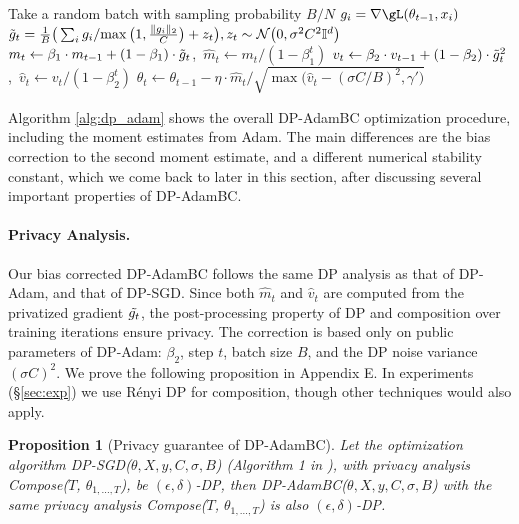 \documentclass[letterpaper]{article} %
\newtheorem{proposition}{Proposition}
\def\cN{\mathcal{N}}
\def\I{\mathbb{I}}
\begin{document}
\begin{algorithm}[h]
\DontPrintSemicolon
\SetAlgoLined
\scriptsize
{}
  {
    Take a random batch with sampling probability $B/N$ \;
    $g_i = \nabla \gL(\theta_{t-1}, x_i)$ \;
    $\Tilde{g}_t = \frac{1}{B} \big( \sum_{i} g_{i} / {\max{\big(1, \frac{\lVert g_i \rVert_{2}}{ C}} \big)} + z_t \big), z_t \sim \cN\big(0, \sigma^{2}C^{2}\I^{d}\big)$ \;
    $m_{t} \leftarrow \beta_{1} \cdot m_{t-1} + \left(1-\beta_{1}\right) \cdot \Tilde{g}_t$,\, $\widehat{m}_{t} \leftarrow m_{t} /\left(1-\beta_{1}^{t}\right)$ \;
    $v_{t} \leftarrow \beta_{2} \cdot v_{t-1}+\left(1-\beta_{2}\right) \cdot \Tilde{g}_t^{2}$,\, $\widehat{v}_{t} \leftarrow v_{t} /\left(1-\beta_{2}^{t}\right)$ \;
    $\theta_{t} \leftarrow \theta_{t-1} - \eta \cdot \hat{m}_t / \sqrt{\max{\big(\hat{v}_t - (\sigma C / B)^{2}}, \gamma' \big)}$
  }
 \caption{DP-AdamBC (with corrected DP bias in second moment estimation)}
 \label{alg:dp_adam}
\end{algorithm}

Algorithm \ref{alg:dp_adam} shows the overall DP-AdamBC optimization procedure, including the moment estimates from Adam. The main differences are the bias correction to the second moment estimate, and a different numerical stability constant, which we come back to later in this section, after discussing several important properties of DP-AdamBC.

\paragraph{Privacy Analysis.} Our bias corrected DP-AdamBC follows the same DP analysis as that of DP-Adam, and that of DP-SGD. Since both $\hat{m}_t$ and $\hat{v}_t$ are computed from the privatized gradient $\Tilde{g_t}$, the post-processing property of DP and composition over training iterations ensure privacy. The correction is based only on public parameters of DP-Adam: $\beta_{2}$, step $t$, batch size $B$, and the DP noise variance $(\sigma C)^{2}$. We prove the following proposition in Appendix E. In experiments (\S\ref{sec:exp}) we use R\'enyi DP for composition, though other techniques would also apply.

\begin{proposition}[Privacy guarantee of DP-AdamBC]
\label{prop:privacy_guarantee}
    Let the optimization algorithm DP-SGD($\theta, X, y, C, \sigma, B$) (Algorithm 1 in \citet{abadi2016deep}),
    with privacy analysis \textit{Compose}($T$, $\theta_{1,\ldots,T}$), be $(\epsilon, \delta)$-DP, then DP-AdamBC($\theta, X, y, C, \sigma, B$) with the same privacy analysis \textit{Compose}($T$, $\theta_{1,\ldots,T}$) is also $(\epsilon, \delta)$-DP.
\end{proposition}
\end{document}
